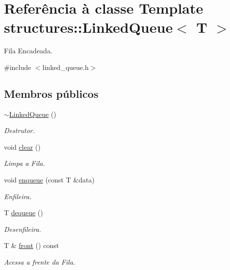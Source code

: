 \hypertarget{classstructures_1_1_linked_queue}{}\section{Referência à classe Template structures\+::Linked\+Queue$<$ T $>$}
\label{classstructures_1_1_linked_queue}


Fila Encadeada.  




{\ttfamily \#include $<$linked\+\_\+queue.\+h$>$}

\subsection*{Membros públicos}
\begin{DoxyCompactItemize}
\item 
\mbox{\hyperlink{classstructures_1_1_linked_queue_ab08efd98f87a1dcd7a2c40588778cb80}{$\sim$\+Linked\+Queue}} ()
\begin{DoxyCompactList}\small\item\em Destrutor. \end{DoxyCompactList}\item 
void \mbox{\hyperlink{classstructures_1_1_linked_queue_a7fd13289965085b6224d3c87e9555a1a}{clear}} ()
\begin{DoxyCompactList}\small\item\em Limpa a Fila. \end{DoxyCompactList}\item 
void \mbox{\hyperlink{classstructures_1_1_linked_queue_a5027f4816daee604112244f85f3cac10}{enqueue}} (const T \&data)
\begin{DoxyCompactList}\small\item\em Enfileira. \end{DoxyCompactList}\item 
T \mbox{\hyperlink{classstructures_1_1_linked_queue_aa4bc66721090abcbd77549fc53694de8}{dequeue}} ()
\begin{DoxyCompactList}\small\item\em Desenfileira. \end{DoxyCompactList}\item 
T \& \mbox{\hyperlink{classstructures_1_1_linked_queue_aa6d2f0263b390193d2aae72499aa00b4}{front}} () const
\begin{DoxyCompactList}\small\item\em Acessa a frente da Fila. \end{DoxyCompactList}\item 

\end{DoxyCompactItemize}
